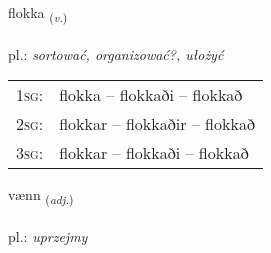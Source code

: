 \documentclass[frontgrid, backgrid]{flacards}\usepackage[]{graphicx}\usepackage[]{xcolor}
\begin{document}
\renewcommand{\flhead}{\vskip5pt \fboxsep=0pt {\small\bfseries\footnotesize Sagnorð | Verb}}
\renewcommand{\fcfoot}{\vskip5pt \fboxsep=0pt \hspace{2pt}{\small\bfseries\footnotesize 2K}}

\renewcommand{\blhead}{\vskip5pt {\small\bfseries\footnotesize Sagnorð | Verb }}
\renewcommand{\bcfoot}{\vskip5pt \hspace{2pt}{\small\bfseries\footnotesize 2K}}


{flokka \small{\textsubscript{(\textit{v.})}} \\[1ex] %
\textphonetic{[flɔhka]} \\
pl.: \emph{sortować, organizować?, ułożyć} \\  [2ex]
\renewcommand*{\arraystretch}{0.8}
\begin{tabular}{p{1cm}l}
\textsc{1sg}: & flokka -- flokkaði -- flokkað \\ 
\textsc{2sg}: & flokkar -- flokkaðir -- flokkað \\ 
\textsc{3sg}: & flokkar -- flokkaði -- flokkað \\ 
\end{tabular}
}

\renewcommand{\flhead}{\vskip5pt \fboxsep=0pt {\small\bfseries\footnotesize Lýsingarorð | Adjective}}
\renewcommand{\fcfoot}{\vskip5pt \fboxsep=0pt \hspace{2pt}{\small\bfseries\footnotesize 2K}}

\renewcommand{\blhead}{\vskip5pt {\small\bfseries\footnotesize Lýsingarorð | Adjective }}
\renewcommand{\bcfoot}{\vskip5pt \hspace{2pt}{\small\bfseries\footnotesize 2K}}


{vænn \small{\textsubscript{(\textit{adj.})}} \\[1ex] %
\textphonetic{[vaitn̥]} \\
pl.: \emph{uprzejmy} \\  [2ex]
\renewcommand*{\arraystretch}{0.8}
}
\end{document}
